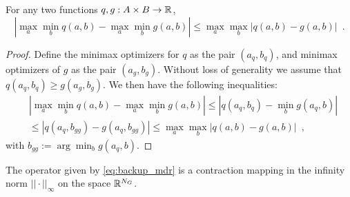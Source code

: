 %
\begin{lemma}\label{lem:maxmin} For any two functions $q, g: A \times B \rightarrow \mathbb{R}$,
\begin{equation}
|\max_a \min_b q(a,b) -\max_a \min_b g(a,b)| \leq \max_a \max_b |q(a,b) - g(a,b)|
\enspace.
\end{equation}
\end{lemma}
%
\begin{proof}
Define the minimax optimizers for $q$ as the pair $(a_q,b_q)$, and minimax optimizers of $g$ as the pair $(a_g, b_g)$. Without loss of generality we assume that $q(a_q,b_q) \geq g(a_g,b_g)$.
We then have the following inequalities:
%
\begin{equation*}
\begin{split}
&|\max_a \min_b q(a,b) -\max_a \min_b g(a,b)|
\leq |q(a_q,b_q) - \min_b g(a_q,b)|\\
&\leq |q(a_q,b_{gg}) - g(a_q,b_{gg})| \leq \max_a \max_b |q(a,b) - g(a,b)|
\enspace,
\end{split}
\end{equation*}
with $b_{gg} :=\displaystyle{\arg\min_b g(a_q,b)}$.
%
\end{proof}
%
\begin{proposition} 
The operator given by \eqref{eq:backup_mdr} is a contraction mapping in the infinity norm $|| \cdot ||_{\infty}$ on the space $\mathbb{R}^{N_G}$.
\end{proposition}
